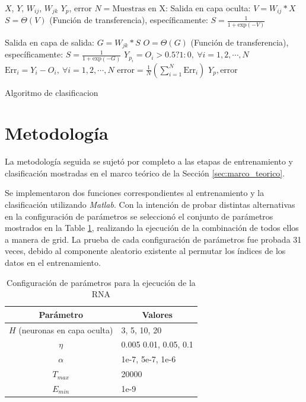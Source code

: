 \documentclass[journal]{IEEEtran}
\begin{document}
\begin{algorithm} 
\footnotesize
\begin{algorithmic}[1] 
\REQUIRE  $X$, $Y$, $W_{ij}$, $W_{jk}$
\ENSURE $Y_p$, $\text{error}$
\STATE $N=\text{Muestras en X}$:
\STATE Salida en capa oculta:
\STATE $V = W_{ij} * X$
\STATE $S = \Theta (V)$ (Función de transferencia), específicamente: $S = \frac{1}{1 + \text{exp}(-V)}$

\STATE Salida en capa de salida:
\STATE $G = W_{jk} * S$
\STATE $O = \Theta (G)$ (Función de transferencia), específicamente: $S = \frac{1}{1 + \text{exp}(-G)}$
\STATE $Y_{p_i} = O_i > 0.5? 1 : 0, ~\forall i = 1,2,\cdots,N$
\STATE $\text{Err}_i = Y_i - O_i, ~\forall i = 1,2,\cdots,N$
\STATE $\text{error} = \frac{1}{N}(\sum_{i=1}^{N}\text{Err}_i)$
\RETURN $Y_p,\text{error}$
\end{algorithmic} 
\caption{Algoritmo de clasificacion} 
\label{alg:algoritmo-clasificacion}
\end{algorithm}

\section{Metodología}
\label{sec:metodologia}
La metodología seguida se sujetó por completo a las etapas de entrenamiento y clasificación mostradas en el marco teórico de la Sección \ref{sec:marco_teorico}.

Se implementaron dos funciones correspondientes al entrenamiento y la clasificación utilizando \emph{Matlab}.
Con la intención de probar distintas alternativas en la configuración de parámetros se  seleccionó el conjunto de parámetros mostrados en la Table \ref{tbl:parametros}, realizando la ejecución de la combinación de todos ellos a manera de grid.
La prueba de cada configuración de parámetros fue probada 31 veces, debido al componente aleatorio existente al permutar los índices de los datos en el entrenamiento.

\begin{table}[h]
\centering
\begin{tabular}{@{}cl@{}}
\toprule
\textbf{Parámetro} & \multicolumn{1}{c}{\textbf{Valores}} \\ \midrule
$H$ (neuronas en capa oculta)                  & 3, 5, 10, 20                         \\
$\eta$                & 0.005 0.01, 0.05, 0.1                \\
$\alpha$             & 1e-7, 5e-7, 1e-6                     \\
$T_{max}$          & 20000                                \\
$E_{min}$          & 1e-9                                 \\ \bottomrule
\end{tabular}
\caption{Configuración de parámetros para la ejecución de la RNA}
\label{tbl:parametros}
\end{table}
\end{document}
